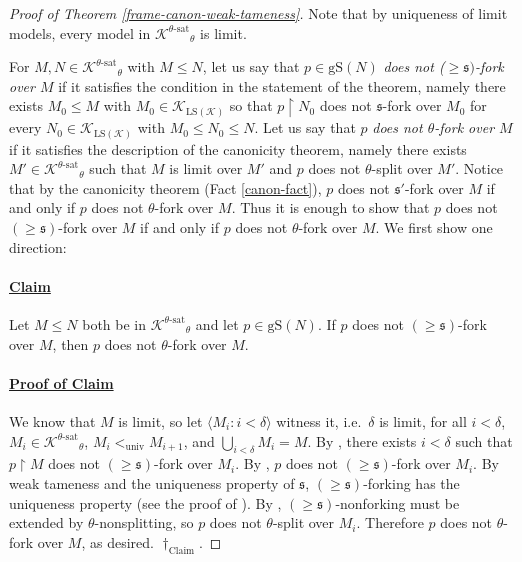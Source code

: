 \documentclass[12pt]{amsart}
\theoremstyle{definition}
\begin{document}
\begin{proof}[Proof of Theorem \ref{frame-canon-weak-tameness}]
  Note that by uniqueness of limit models, every model in ${{{{\mathcal{K}}}^{{{\theta}}\text{-sat}}}}_\theta$ is limit. 

  For $M, N \in {{{{\mathcal{K}}}^{{{\theta}}\text{-sat}}}}_\theta$ with $M {\le} N$, let us say that $p \in {\text{gS}} (N)$ \emph{does not ($\ge {\mathfrak{s}})$-fork over $M$} if it satisfies the condition in the statement of the theorem, namely there exists $M_0 {\le} M$ with $M_0 \in {\mathcal{K}}_{{\text{LS}} ({\mathcal{K}})}$ so that $p {\upharpoonright} N_0$ does not ${\mathfrak{s}}$-fork over $M_0$ for every $N_0 \in {\mathcal{K}}_{{\text{LS}} ({\mathcal{K}})}$ with $M_0 {\le} N_0 {\le} N$. Let us say that $p$ \emph{does not $\theta$-fork over $M$} if it satisfies the description of the canonicity theorem, namely there exists $M' \in {{{{\mathcal{K}}}^{{{\theta}}\text{-sat}}}}_{\theta}$ such that $M$ is limit over $M'$ and $p$ does not $\theta$-split over $M'$. Notice that by the canonicity theorem (Fact \ref{canon-fact}), $p$ does not ${\mathfrak{s}}'$-fork over $M$ if and only if $p$ does not $\theta$-fork over $M$. Thus it is enough to show that $p$ does not $(\ge {\mathfrak{s}})$-fork over $M$ if and only if $p$ does not $\theta$-fork over $M$. We first show one direction:
  
  \paragraph{\underline{Claim}} Let $M {\le} N$ both be in ${{{{\mathcal{K}}}^{{{\theta}}\text{-sat}}}}_\theta$ and let $p \in {\text{gS}} (N)$. If $p$ does not $(\ge {\mathfrak{s}})$-fork over $M$, then $p$ does not $\theta$-fork over $M$.
  
  \paragraph{\underline{Proof of Claim}} We know that $M$ is limit, so let ${\langle {M_i : i < \delta} \rangle}$ witness it, i.e.\ $\delta$ is limit, for all $i < \delta$, $M_i \in {{{{\mathcal{K}}}^{{{\theta}}\text{-sat}}}}_{\theta}$, $M_i {{<}_{\text{univ}}} M_{i + 1}$, and $\bigcup_{i < \delta} M_i = M$. By \cite[Claim II.2.11.(5)]{shelahaecbook}, there exists $i < \delta$ such that $p {\upharpoonright} M$ does not $(\ge {\mathfrak{s}})$-fork over $M_i$. By \cite[Claim II.2.11.(4)]{shelahaecbook}, $p$ does not $(\ge {\mathfrak{s}})$-fork over $M_i$. By weak tameness and the uniqueness property of ${\mathfrak{s}}$, $(\ge {\mathfrak{s}})$-forking has the uniqueness property (see the proof of \cite[Theorem 3.2]{ext-frame-jml}). By \cite[Lemma 4.2]{bgkv-v2}, $(\ge {\mathfrak{s}})$-nonforking must be extended by $\theta$-nonsplitting, so $p$ does not $\theta$-split over $M_i$. Therefore $p$ does not $\theta$-fork over $M$, as desired. $\dagger_{\text{Claim}}$.


\end{proof}
\end{document}
